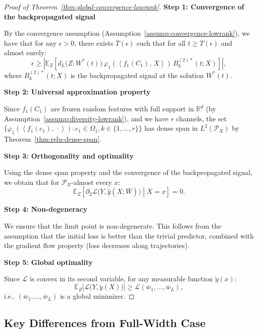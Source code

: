 \documentclass[11pt]{article}
\newcommand{\E}{\mathbb{E}}
\newcommand{\R}{\mathbb{R}}
\newcommand{\1}{\mathbbm{1}}
\newcommand{\ip}[2]{\left\langle #1,\,#2 \right\rangle}
\begin{document}
\begin{proof}[Proof of Theorem~\ref{thm:global-convergence-lowrank}]

\textbf{Step 1: Convergence of the backpropagated signal}

By the convergence assumption (Assumption~\ref{assump:convergence-lowrank}), we have that for any $\epsilon>0$, there exists $T(\epsilon)$ such that for all $t\ge T(\epsilon)$ and almost surely:
\[
\epsilon \ge \left|\E_{Z}\!\left[d_L\big(Z;W^*(t)\big)\,\varphi_1\!\left(\ip{f_1(C_1)}{X}\right)\,B_k^{(2)*}(t;X)\right]\right|,
\]
where $B_k^{(2)*}(t;X)$ is the backpropagated signal at the solution $W^*(t)$.

\textbf{Step 2: Universal approximation property}

Since $f_1(C_1)$ are frozen random features with full support in $\R^d$ (by Assumption~\ref{assump:diversity-lowrank}), and we have $r$ channels, the set $\{\varphi_1(\ip{f_1(c_1)}{\cdot}): c_1\in\Omega_1, k\in\{1,\dots,r\}\}$ has dense span in $L^2(\mathcal{P}_X)$ by Theorem~\ref{thm:relu-dense-span}.

\textbf{Step 3: Orthogonality and optimality}

Using the dense span property and the convergence of the backpropagated signal, we obtain that for $\mathcal{P}_X$-almost every $x$:
\[
\E_{Z}\!\left[\partial_2\mathcal{L}\big(Y,\hat y(X;\bar{W})\big)\middle|X=x\right] = 0.
\]

\textbf{Step 4: Non-degeneracy}

We ensure that the limit point is non-degenerate. This follows from the assumption that the initial loss is better than the trivial predictor, combined with the gradient flow property (loss decreases along trajectories).

\textbf{Step 5: Global optimality}

Since $\mathcal{L}$ is convex in its second variable, for any measurable function $\tilde{y}(x)$:
\[
\E_Z\big[\mathcal{L}\big(Y,\tilde{y}(X)\big)\big] \ge \mathscr{L}(\bar{w}_1,\ldots,\bar{w}_L),
\]
i.e., $(\bar{w}_1,\ldots,\bar{w}_L)$ is a global minimizer.

\end{proof}

\subsection{Key Differences from Full-Width Case}
\end{document}
